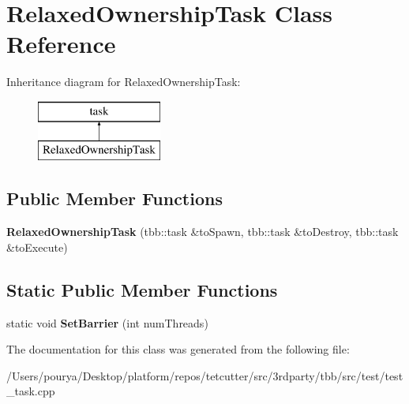 \hypertarget{classRelaxedOwnershipTask}{}\section{Relaxed\+Ownership\+Task Class Reference}
\label{classRelaxedOwnershipTask}
Inheritance diagram for Relaxed\+Ownership\+Task\+:\begin{figure}[H]
\begin{center}
\leavevmode
\includegraphics[height=2.000000cm]{classRelaxedOwnershipTask}
\end{center}
\end{figure}
\subsection*{Public Member Functions}
\begin{DoxyCompactItemize}
\item 
\hypertarget{classRelaxedOwnershipTask_ac7f9a28a9f5a205d1258a62320e9e9ce}{}{\bfseries Relaxed\+Ownership\+Task} (tbb\+::task \&to\+Spawn, tbb\+::task \&to\+Destroy, tbb\+::task \&to\+Execute)\label{classRelaxedOwnershipTask_ac7f9a28a9f5a205d1258a62320e9e9ce}

\end{DoxyCompactItemize}
\subsection*{Static Public Member Functions}
\begin{DoxyCompactItemize}
\item 
\hypertarget{classRelaxedOwnershipTask_aa7672ce03b2622a03989a0d9af299399}{}static void {\bfseries Set\+Barrier} (int num\+Threads)\label{classRelaxedOwnershipTask_aa7672ce03b2622a03989a0d9af299399}

\end{DoxyCompactItemize}


The documentation for this class was generated from the following file\+:\begin{DoxyCompactItemize}
\item 
/\+Users/pourya/\+Desktop/platform/repos/tetcutter/src/3rdparty/tbb/src/test/test\+\_\+task.\+cpp\end{DoxyCompactItemize}
